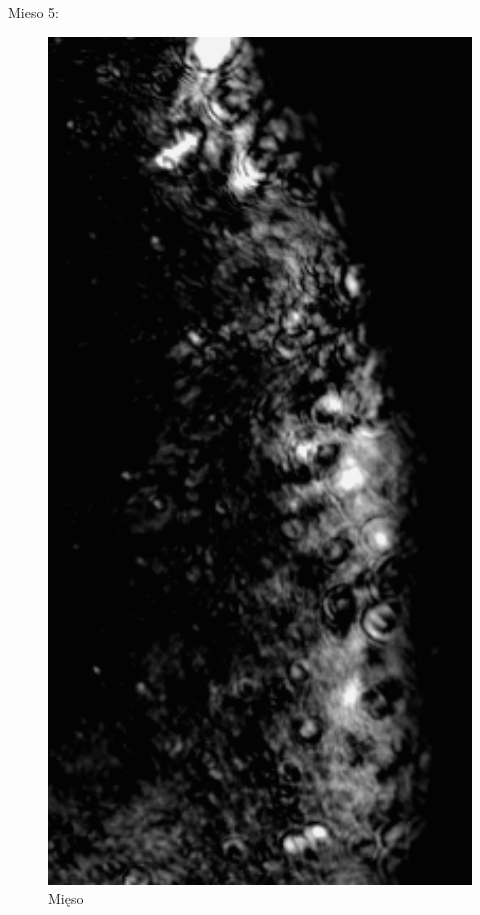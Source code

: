 \documentclass[a4paper,12pt]{article}
\begin{document}
Mieso 5:

\begin{figure} [H]
  \begin{center}
    \includegraphics[width = 15cm]{data/5MIES1.png}
    \caption{Mięso}
  \end{center}
\end{figure}
\end{document}
